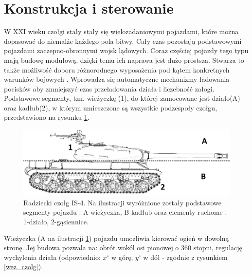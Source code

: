 \section{Konstrukcja i sterowanie}
W XXI wieku czołgi stały stały się wielozadaniowymi pojazdami, które można dopasować do niemalże każdego pola bitwy. Cały czas pozostają podstawowymi pojazdami zaczepno-obronnymi wojsk lądowych. Coraz częściej pojazdy tego typu mają budowę modułową, dzięki temu ich naprawa jest dużo prostsza. Stwarza to także możliwość doboru różnorodnego wyposażenia pod kątem konkretnych warunków bojowych \cite{kierunek_rozwoju}. Wprowadza się automatyczne mechanizmy ładowania pocisków aby zmniejszyć czas przeładowania działa i liczebność załogi. Podstawowe segmenty, tzn. wieżyczkę (1), do której zamocowane jest działo(A) oraz kadłub(2), w którym umieszczone są wszystkie podzespoły czołgu, przedstawiono na rysunku \ref{podzal}. 

  \begin{figure}[H]
    \begin{center}
      \includegraphics[scale=0.5]{imgs/cz_bud.png}
 	\caption[Czołg \textit{IS-4} - podział]{\small{Radziecki czołg IS-4. Na ilustracji wyróżnione zostały podstawowe segmenty pojazdu : A-wieżyczka, B-kadłub oraz elementy ruchome : 1-działo, 2-gąsiennice.}\footnotemark[12]}
	\label{podzal}
    \end{center}
  \end{figure}

\newpage

Wieżyczka (A na ilustracji \ref{podzal}) pojazdu umożliwia kierować ogień w dowolną stronę. Jej budowa pozwala na: obrót wokól osi pionowej o 360 stopni, regulację wychylenia działa (odpowiednio: $x^\circ$ w górę, $y^\circ$ w dół - zgodnie z rysunkiem \ref{wez_czolg}).

